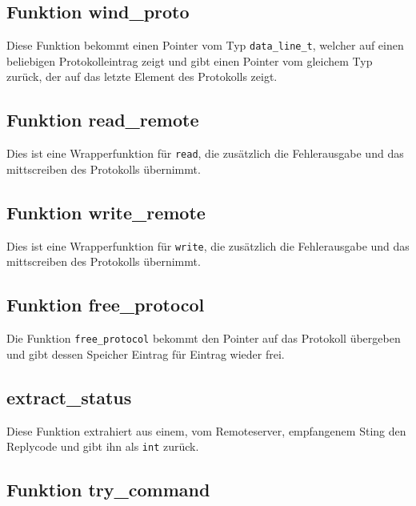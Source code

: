 \documentclass[pdftex,final,a4paper,10pt,notitlepage,halfparskip]{scrreprt}
\begin{document}
\subsection{Funktion wind\_proto}\label{wind_proto}
Diese Funktion bekommt einen Pointer vom Typ \texttt{data\_line\_t}, welcher auf einen beliebigen Protokolleintrag zeigt und gibt einen Pointer vom gleichem Typ zurück, der auf das letzte Element des Protokolls zeigt.

\subsection{Funktion read\_remote}\label{read_remote}
Dies ist eine Wrapperfunktion für \texttt{read}, die zusätzlich die Fehlerausgabe und das mittscreiben des Protokolls übernimmt.

\subsection{Funktion write\_remote}\label{write_remote}
Dies ist eine Wrapperfunktion für \texttt{write}, die zusätzlich die Fehlerausgabe und das mittscreiben des Protokolls übernimmt.

\subsection{Funktion free\_protocol}\label{free_protocol}
Die Funktion \texttt{free\_protocol} bekommt den Pointer auf das Protokoll übergeben und gibt dessen Speicher Eintrag für Eintrag wieder frei.

\subsection{extract\_status}\label{extract_status}
Diese Funktion extrahiert aus einem, vom Remoteserver, empfangenem Sting den Replycode und gibt ihn als \texttt{int} zurück.

\subsection{Funktion try\_command}\label{try_command}
\end{document}
